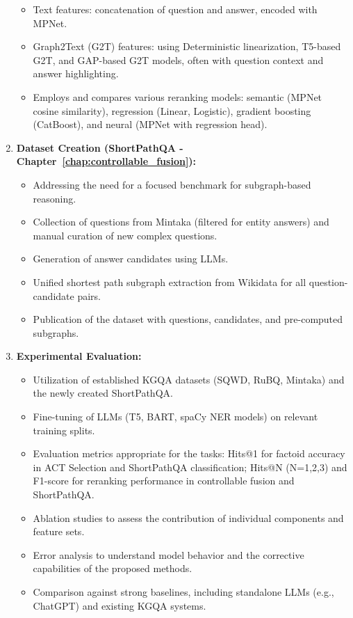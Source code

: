 \begin{enumerate}
\begin{itemize}
                \item Text features: concatenation of question and answer, encoded with MPNet.
                \item Graph2Text (G2T) features: using Deterministic linearization, T5-based G2T, and GAP-based G2T models, often with question context and answer highlighting.
            \item Employs and compares various reranking models: semantic (MPNet cosine similarity), regression (Linear, Logistic), gradient boosting (CatBoost), and neural (MPNet with regression head).
    \end{itemize}
    \item \textbf{Dataset Creation (ShortPathQA - Chapter~\ref{chap:controllable_fusion}):}
    \begin{itemize}
        \item Addressing the need for a focused benchmark for subgraph-based reasoning.
        \item Collection of questions from Mintaka (filtered for entity answers) and manual curation of new complex questions.
        \item Generation of answer candidates using LLMs.
        \item Unified shortest path subgraph extraction from Wikidata for all question-candidate pairs.
        \item Publication of the dataset with questions, candidates, and pre-computed subgraphs.
    \end{itemize}
    \item \textbf{Experimental Evaluation:}
    \begin{itemize}
        \item Utilization of established KGQA datasets (SQWD, RuBQ, Mintaka) and the newly created ShortPathQA.
        \item Fine-tuning of LLMs (T5, BART, spaCy NER models) on relevant training splits.
        \item Evaluation metrics appropriate for the tasks: Hits@1 for factoid accuracy in ACT Selection and ShortPathQA classification; Hits@N (N=1,2,3) and F1-score for reranking performance in controllable fusion and ShortPathQA.
        \item Ablation studies to assess the contribution of individual components and feature sets.
        \item Error analysis to understand model behavior and the corrective capabilities of the proposed methods.
        \item Comparison against strong baselines, including standalone LLMs (e.g., ChatGPT) and existing KGQA systems.

\end{itemize}
\end{enumerate}
